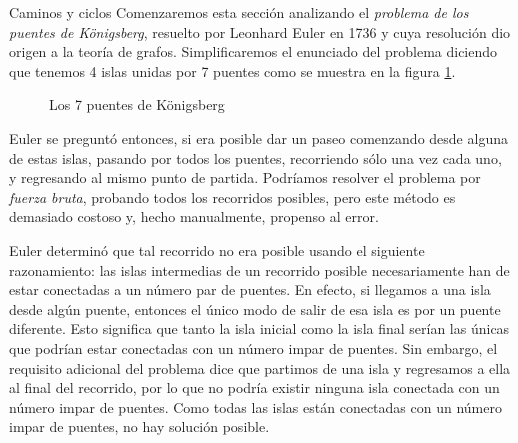 \documentclass[11pt,spanish,makeidx]{amsbook}
\theoremstyle{definition}
\theoremstyle{remark}
\begin{document}
\begin{section}{Caminos y ciclos}\label{5.4}
Comenzaremos esta sección analizando el \textit{problema de los puentes de Königsberg}, resuelto por Leonhard Euler en 1736 y cuya resolución dio origen a la teoría de grafos. Simplificaremos el enunciado del problema diciendo que tenemos 4 islas unidas por 7 puentes como se muestra en la figura \ref{figure-7-puentes}.
\begin{figure}[ht]
\caption{Los 7 puentes de Königsberg} \label{figure-7-puentes}
\end{figure}

Euler se preguntó entonces, si era posible dar un paseo comenzando desde alguna de estas islas, pasando por todos los puentes, recorriendo sólo una vez cada uno, y regresando al mismo punto de partida. Podríamos resolver el problema por \textit{fuerza bruta}, probando todos los recorridos posibles, pero este método es demasiado costoso y, hecho manualmente,  propenso al error.

Euler determinó que tal recorrido no era posible usando el siguiente razonamiento: las islas intermedias de un recorrido posible necesariamente han de estar conectadas a un número par de puentes. En efecto, si llegamos a una isla desde algún puente, entonces el único modo de salir de esa isla es por un puente diferente. Esto significa que tanto la isla inicial como la isla final serían las únicas que podrían estar conectadas con un número impar de puentes. Sin embargo, el requisito adicional del problema dice que partimos de una isla y regresamos a ella al final del recorrido, por lo que no podría existir ninguna isla conectada con un número impar de puentes. Como todas las islas están conectadas con un número impar de puentes, no hay solución posible.


\end{section}
\end{document}
